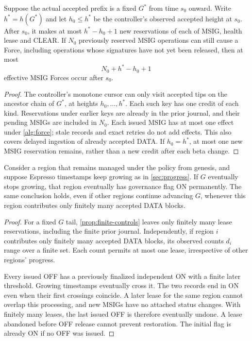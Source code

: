 \begin{proposition}
\label{prop:finite-controls}
Suppose the actual accepted prefix is a fixed $G^*$ from time $s_0$
onward. Write $h^*=h(G^*)$ and let $h_0\le h^*$ be the controller's
observed accepted height at $s_0$. After $s_0$, it makes at most
$h^*-h_0+1$ new reservations of each of MSIG, health lease and CLEAR.
If $N_0$ previously reserved MSIG operations can still cause a Force,
including operations whose signatures have not yet been released, then
at most
\[
 N_0+h^*-h_0+1
\]
effective MSIG Forces occur after $s_0$.
\end{proposition}
\begin{proof}
The controller's monotone cursor can only visit accepted tips on the
ancestor chain of $G^*$, at heights $h_0,\ldots,h^*$. Each such key has
one credit of each kind. Reservations under earlier keys are already
in the prior journal, and their pending MSIGs are included in $N_0$.
Each issued MSIG has at most one effect under \cref{alg:force}; stale
records and exact retries do not add effects. This also covers delayed
ingestion of already accepted DATA. If $h_0=h^*$, at most one new MSIG
reservation remains, rather than a new credit after each beta change.
\end{proof}

\begin{proposition}
\label{prop:health-restoration}
Consider a region that remains managed under the policy from genesis,
and suppose Espresso timestamps keep growing as in \cref{sec:progress}.
If $G$ eventually stops growing, that region eventually has governance
flag ON permanently. The same conclusion holds, even if other regions
continue advancing $G$, whenever this region contributes only finitely
many accepted DATA blocks.
\end{proposition}
\begin{proof}
For a fixed $G$ tail, \cref{prop:finite-controls} leaves only finitely
many lease reservations, including the finite prior journal. Independently,
if region $i$ contributes only finitely many accepted DATA blocks, its
observed counts $d_i$ range over a finite set. Each count permits at most
one lease, irrespective of other regions' progress.

Every issued OFF has a previously finalized independent ON with a finite
later threshold. Growing timestamps eventually cross it. The two records
end in ON even when their first crossings coincide. A later lease for
the same region cannot overlap this processing, and new MSIGs have no
attached status changes. With finitely many leases, the last issued OFF
is therefore eventually undone. A lease abandoned before OFF release
cannot prevent restoration. The initial flag is already ON if no OFF
was issued.
\end{proof}

